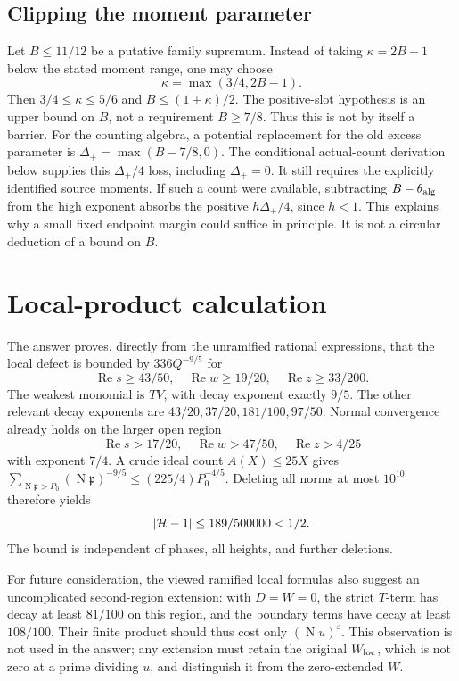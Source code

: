 \documentclass[12pt]{article}
\newcommand{\Rea}{\operatorname{Re}}
\newcommand{\N}{\operatorname{N}}
\begin{document}
\subsection{Clipping the moment parameter}
Let \(B\leq11/12\) be a putative family supremum.
Instead of taking \(\kappa=2B-1\) below the stated moment range,
one may choose
\[
 \kappa=\max(3/4,2B-1).
\]
Then \(3/4\leq\kappa\leq5/6\) and \(B\leq(1+\kappa)/2\).
The positive-slot hypothesis is an upper bound on \(B\), not a
requirement \(B\geq7/8\).  Thus this is not by itself a barrier.
For the counting algebra, a potential replacement for the old excess
parameter is \(\Delta_+=\max(B-7/8,0)\).
The conditional actual-count derivation below supplies this
\(\Delta_+/4\) loss, including \(\Delta_+=0\).  It still requires
the explicitly identified source moments.
If such a count were available, subtracting
\(B-\theta_{\rm alg}\) from the high exponent absorbs the positive
\(h\Delta_+/4\), since \(h<1\).
This explains why a small fixed endpoint margin could suffice in
principle.  It is not a circular deduction of a bound on \(B\).

\section{Local-product calculation}
The answer proves, directly from the unramified rational expressions,
that the local defect is bounded by \(336Q^{-9/5}\) for
\[
 \Rea s\geq43/50,\quad \Rea w\geq19/20,\quad
 \Rea z\geq33/200.
\]
The weakest monomial is \(TV\), with decay exponent exactly \(9/5\).
The other relevant decay exponents are
\(43/20,37/20,181/100,97/50\).
Normal convergence already holds on the larger open region
\[
 \Rea s>17/20,\quad\Rea w>47/50,\quad\Rea z>4/25
\]
with exponent \(7/4\).
A crude ideal count \(A(X)\leq25X\) gives
\(\sum_{\N\mathfrak p>P_0}(\N\mathfrak p)^{-9/5}
 \leq(225/4)P_0^{-4/5}\).
Deleting all norms at most \(10^{10}\) therefore yields
\[
 |{\cal H}-1|\leq189/500000<1/2 .
\]
The bound is independent of phases, all heights, and further deletions.

For future consideration, the viewed ramified local formulas also
suggest an uncomplicated second-region extension: with \(D=W=0\),
the strict \(T\)-term has decay at least \(81/100\) on this region,
and the boundary terms have decay at least \(108/100\).
Their finite product should thus cost only \((\N u)^\varepsilon\).
This observation is not used in the answer; any extension must retain
the original \(W_{\rm loc}\), which is not zero at a prime dividing
\(u\), and distinguish it from the zero-extended \(W\).
\end{document}
